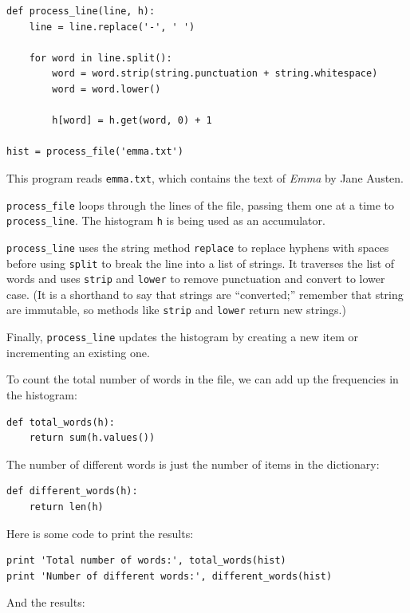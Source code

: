 \documentclass[10pt]{book}
\begin{document}
{\begin{verbatim}
def process_line(line, h):
    line = line.replace('-', ' ')
    
    for word in line.split():
        word = word.strip(string.punctuation + string.whitespace)
        word = word.lower()

        h[word] = h.get(word, 0) + 1

hist = process_file('emma.txt')
\end{verbatim}
\afterverb
%
This program reads {\tt emma.txt}, which contains the text of {\em
  Emma} by Jane Austen.


\verb"process_file" loops through the lines of the file,
passing them one at a time to \verb"process_line".  The histogram
{\tt h} is being used as an accumulator.


\verb"process_line" uses the string method {\tt replace} to replace
hyphens with spaces before using {\tt split} to break the line into a
list of strings.  It traverses the list of words and uses {\tt strip}
and {\tt lower} to remove punctuation and convert to lower case.  (It
is a shorthand to say that strings are ``converted;'' remember that
string are immutable, so methods like {\tt strip} and {\tt lower}
return new strings.)

Finally, \verb"process_line" updates the histogram by creating a new
item or incrementing an existing one.


To count the total number of words in the file, we can add up
the frequencies in the histogram:

\beforeverb
\begin{verbatim}
def total_words(h):
    return sum(h.values())
\end{verbatim}
\afterverb
%
The number of different words is just the number of items in
the dictionary:

\beforeverb
\begin{verbatim}
def different_words(h):
    return len(h)
\end{verbatim}
\afterverb
%
Here is some code to print the results:

\beforeverb
\begin{verbatim}
print 'Total number of words:', total_words(hist)
print 'Number of different words:', different_words(hist)
\end{verbatim}
\afterverb
%
And the results:

}
\end{document}

